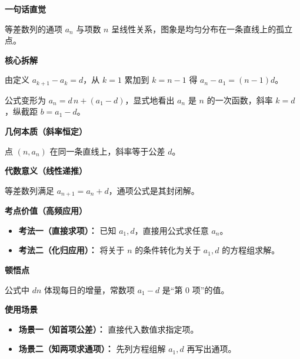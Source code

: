 \begin{explanationbox}
	\textbf{\textcolor{CExplanation}{一句话直觉}}

	等差数列的通项 $a_n$ 与项数 $n$ 呈线性关系，图象是均匀分布在一条直线上的孤立点。

	\medskip
	\textbf{\textcolor{CExplanation}{核心拆解}}
	\begin{description}[style=nextline, leftmargin=2.8em, labelsep=0.5em, itemsep=0.45em]
		\item[\textbf{要点一（累加模型）：}] 由定义 $a_{k+1}-a_k = d$，从 $k=1$ 累加到 $k=n-1$ 得 $a_n - a_1 = (n-1)d$。
		\item[\textbf{要点二（一次函数）：}] 公式变形为 $a_n = d\,n + (a_1-d)$，显式地看出 $a_n$ 是 $n$ 的一次函数，斜率 $k=d$，纵截距 $b=a_1-d$。
	\end{description}

	\medskip
	\textbf{\textcolor{CExplanation}{几何本质（斜率恒定）}}

	点 $(n, a_n)$ 在同一条直线上，斜率等于公差 $d$。

	\medskip
	\textbf{\textcolor{CExplanation}{代数意义（线性递推）}}

	等差数列满足 $a_{n+1} = a_n + d$，通项公式是其封闭解。

	\medskip
	\textbf{\textcolor{CExplanation}{考点价值（高频应用）}}
	\begin{itemize}[leftmargin=*, itemsep=0.5em, topsep=0.4em]
		\item \textbf{考法一（直接求项）：} 已知 $a_1, d$，直接用公式求任意 $a_n$。
		\item \textbf{考法二（化归应用）：} 将关于 $n$ 的条件转化为关于 $a_1, d$ 的方程组求解。
	\end{itemize}

	\medskip
	\textbf{\textcolor{CExplanation}{顿悟点}}

	公式中 $d n$ 体现每日的增量，常数项 $a_1-d$ 是“第 0 项”的值。

	\medskip
	\textbf{\textcolor{CExplanation}{使用场景}}
	\begin{itemize}[leftmargin=*, itemsep=0.5em, topsep=0.4em]
		\item \textbf{场景一（知首项公差）：} 直接代入数值求指定项。
		\item \textbf{场景二（知两项求通项）：} 先列方程组解 $a_1,d$ 再写出通项。
	\end{itemize}
\end{explanationbox}
